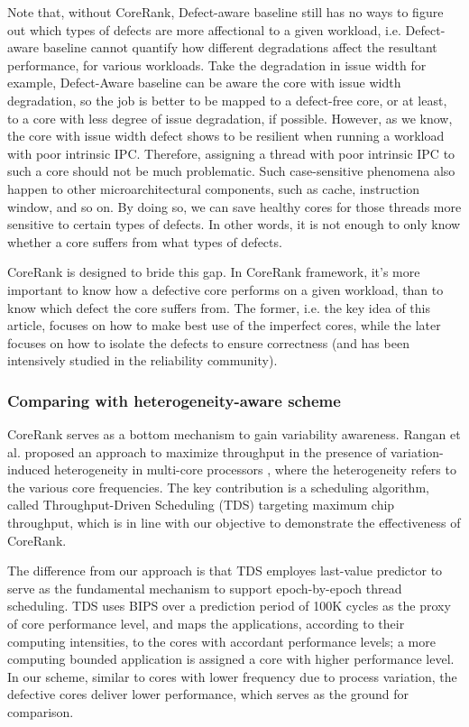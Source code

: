 Note that, without CoreRank, Defect-aware baseline still has no ways to figure out which types of defects are more affectional to a given workload, i.e. Defect-aware baseline cannot quantify how different degradations affect the resultant performance, for various workloads. Take the degradation in issue width for example, Defect-Aware baseline can be aware the core with issue width degradation, so the job is better to be mapped to a defect-free core, or at least, to a core with less degree of issue degradation, if possible. However, as we know, the core with issue width defect shows to be resilient when running a workload with poor intrinsic IPC.  Therefore, assigning a thread with poor intrinsic IPC to such a core should not be much problematic. Such case-sensitive phenomena also happen to other microarchitectural components, such as cache, instruction window, and so on.  By doing so, we can save healthy cores for those threads more sensitive to certain types of defects.  In other words, it is not enough to only know whether a core suffers from what types of defects. 

CoreRank is designed to bride this gap. In CoreRank framework, it's more important to know how a defective core performs on a given workload, than to know which defect the core suffers from.  The former, i.e. the key idea of this article, focuses on how to make best use of the imperfect cores, while the later focuses on how to isolate the defects to ensure correctness (and has been intensively studied in the reliability community).   



\subsubsection{Comparing with heterogeneity-aware scheme}
CoreRank serves as a bottom mechanism to gain variability awareness.  Rangan et al. proposed an approach to maximize throughput in the presence of variation-induced heterogeneity in multi-core processors \cite{TDS}, where the heterogeneity refers to the various core frequencies. The key contribution is a scheduling algorithm, called Throughput-Driven Scheduling (TDS) targeting maximum chip throughput, which is in line with our objective to demonstrate the effectiveness of CoreRank.  

The difference from our approach is that TDS employes last-value predictor to serve as the fundamental mechanism to support epoch-by-epoch thread scheduling. TDS uses BIPS over a prediction period of 100K cycles  as the proxy of core performance level, and maps the applications, according to their computing intensities, to the cores with accordant performance levels; a more computing bounded application is assigned a core with higher performance level.   In our scheme, similar to cores with lower frequency due to process variation, the defective cores deliver lower performance, which serves as the ground for comparison. 

